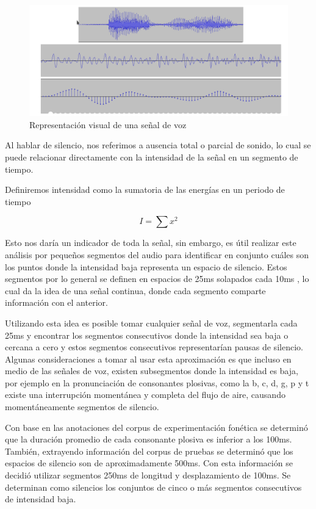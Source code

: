 \begin{figure}[H]
\caption{Representación visual de una señal de voz}
\label{img:pcm}
\includegraphics[width=\textwidth]{imagenes/04_01_pcm.png}
\end{figure}

Al hablar de silencio, nos referimos a ausencia total o parcial de sonido, lo cual se puede relacionar directamente con la intensidad de la señal en un segmento de tiempo.

Definiremos intensidad como la sumatoria de las energías en un periodo de tiempo  \cite{Jurafsky2000SpeechRecognition}    

\begin{equation}
\label{eq:energy}
I = \sum{x^2}  
\end{equation}

Esto nos daría un indicador de toda la señal, sin embargo, es útil realizar este análisis por pequeños segmentos del audio para identificar en conjunto cuáles son los puntos donde la intensidad baja representa un espacio de silencio. Estos segmentos por lo general se definen en espacios de 25ms solapados cada 10ms \cite{Jurafsky2000SpeechRecognition}, lo cual da la idea de una señal continua, donde cada segmento comparte información con el anterior. 

Utilizando esta idea es posible tomar cualquier señal de voz, segmentarla cada 25ms y encontrar los segmentos consecutivos donde la intensidad sea baja o cercana a cero y estos segmentos consecutivos representarían pausas de silencio. Algunas consideraciones a tomar al usar esta aproximación es que incluso en medio de las señales de voz, existen subsegmentos donde la intensidad es baja, por ejemplo en la pronunciación de consonantes plosivas, como la b, c, d, g, p y t existe una interrupción momentánea y completa del flujo de aire, causando momentáneamente segmentos de silencio.

Con base en las anotaciones del corpus de experimentación fonética se determinó que la duración promedio de cada consonante plosiva es inferior a los 100ms. También, extrayendo información del corpus de pruebas se determinó que los espacios de silencio son de aproximadamente 500ms. Con esta información se decidió utilizar segmentos 250ms de longitud y desplazamiento de 100ms. Se determinan como silencios los conjuntos de cinco o más segmentos consecutivos de intensidad baja.

